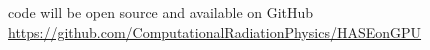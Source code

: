 \autobookmark
{}
\begin{frame}{}
  \begin{center}
    \Large code will be open source and available on GitHub\\[2ex]
    \normalsize\url{https://github.com/ComputationalRadiationPhysics/HASEonGPU}
    \vfill
  \end{center}
\end{frame}
